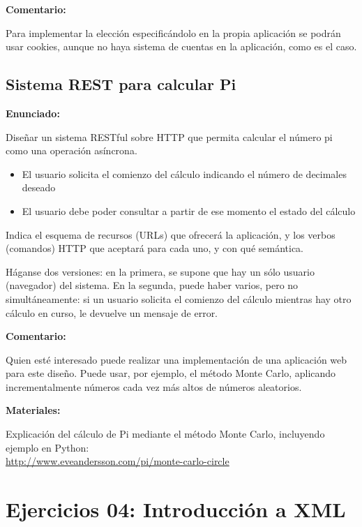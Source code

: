\textbf{Comentario:}

Para implementar la elección especificándolo en la propia aplicación se podrán usar cookies, aunque no haya sistema de cuentas en la aplicación, como es el caso.

\subsection{Sistema REST para calcular Pi}
\label{subsec:rest-pi}

\textbf{Enunciado:}

Diseñar un sistema RESTful sobre HTTP que permita calcular el número pi como una operación asíncrona.

\begin{itemize}
\item El usuario solicita el comienzo del cálculo indicando el número de decimales deseado
\item El usuario debe poder consultar a partir de ese momento el estado del cálculo
\end{itemize}

Indica el esquema de recursos (URLs) que ofrecerá la aplicación, y los verbos (comandos) HTTP que aceptará para cada uno, y con qué semántica.

Háganse dos versiones: en la primera, se supone que hay un sólo usuario (navegador) del sistema. En la segunda, puede haber varios, pero no simultáneamente: si un usuario solicita el comienzo del cálculo mientras hay otro cálculo en curso, le devuelve un mensaje de error.

\textbf{Comentario:}

Quien esté interesado puede realizar una implementación de una aplicación web para este diseño. Puede usar, por ejemplo, el método Monte Carlo, aplicando incrementalmente números cada vez más altos de números aleatorios.

\textbf{Materiales:}

Explicación del cálculo de Pi mediante el método Monte Carlo, incluyendo ejemplo en Python: \\
\url{http://www.eveandersson.com/pi/monte-carlo-circle}


\section{Ejercicios 04: Introducción a XML}


